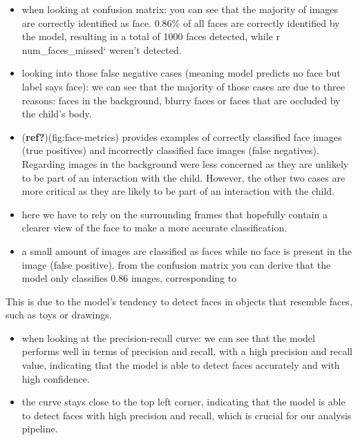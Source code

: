 \documentclass[
  man,floatsintext]{apa6}
\providecommand{\tightlist}{%
  \setlength{\itemsep}{0pt}\setlength{\parskip}{0pt}}
\begin{document}
\begin{itemize}
\tightlist
\item
  when looking at confusion matrix: you can see that the majority of images are correctly identified as face. 0.86\% of all faces are correctly identified by the model, resulting in a total of 1000 faces detected, while r num\_faces\_missed` weren't detected.
\item
  looking into those false negative cases (meaning model predicts no face but label says face): we can see that the majority of those cases are due to three reasons: faces in the background, blurry faces or faces that are occluded by the child's body.
\item
  (\textbf{ref?})(fig:face-metrics) provides examples of correctly classified face images (true positives) and incorrectly classified face images (false negatives).
  Regarding images in the background were less concerned as they are unlikely to be part of an interaction with the child. However, the other two cases are more critical as they are likely to be part of an interaction with the child.
\item
  here we have to rely on the surrounding frames that hopefully contain a clearer view of the face to make a more accurate classification.
\item
  a small amount of images are classified as faces while no face is present in the image (false positive). from the confusion matrix you can derive that the model only classifies 0.86 images, corresponding to
\end{itemize}

This is due to the model's tendency to detect faces in objects that resemble faces, such as toys or drawings.

\begin{itemize}
\tightlist
\item
  when looking at the precision-recall curve: we can see that the model performs well in terms of precision and recall, with a high precision and recall value, indicating that the model is able to detect faces accurately and with high confidence.
\item
  the curve stays close to the top left corner, indicating that the model is able to detect faces with high precision and recall, which is crucial for our analysis pipeline.
\end{itemize}
\end{document}
